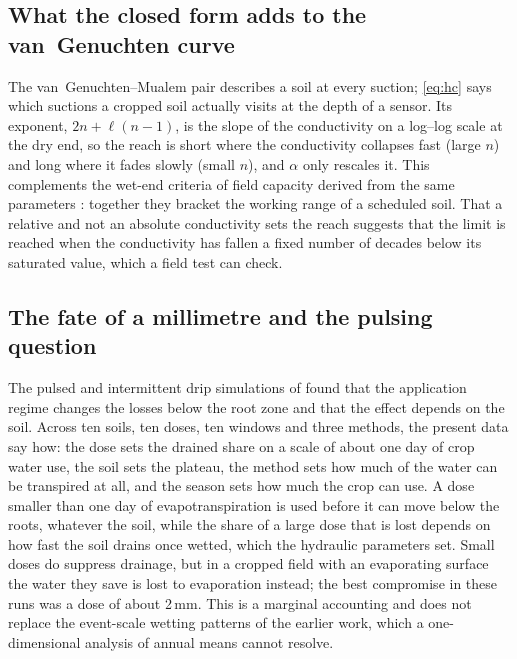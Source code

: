 \documentclass[review,12pt,authoryear]{elsarticle}
\begin{document}
\subsection{What the closed form adds to the van~Genuchten curve}
The van~Genuchten--Mualem pair describes a soil at every suction; \cref{eq:hc} says which suctions a cropped soil actually visits at the depth of a sensor. Its exponent, $2n+\ell(n-1)$, is the slope of the conductivity on a log--log scale at the dry end, so the reach is short where the conductivity collapses fast (large $n$) and long where it fades slowly (small $n$), and $\alpha$ only rescales it. This complements the wet-end criteria of field capacity derived from the same parameters \citep{Twarakavi2009,Assouline2014}: together they bracket the working range of a scheduled soil. That a relative and not an absolute conductivity sets the reach suggests that the limit is reached when the conductivity has fallen a fixed number of decades below its saturated value, which a field test can check.

\subsection{The fate of a millimetre and the pulsing question}
The pulsed and intermittent drip simulations of \citet{Elmaloglou2007,Elmaloglou2008,Elmaloglou2009b} found that the application regime changes the losses below the root zone and that the effect depends on the soil. Across ten soils, ten doses, ten windows and three methods, the present data say how: the dose sets the drained share on a scale of about one day of crop water use, the soil sets the plateau, the method sets how much of the water can be transpired at all, and the season sets how much the crop can use. A dose smaller than one day of evapotranspiration is used before it can move below the roots, whatever the soil, while the share of a large dose that is lost depends on how fast the soil drains once wetted, which the hydraulic parameters set. Small doses do suppress drainage, but in a cropped field with an evaporating surface the water they save is lost to evaporation instead; the best compromise in these runs was a dose of about 2\,mm. This is a marginal accounting and does not replace the event-scale wetting patterns of the earlier work, which a one-dimensional analysis of annual means cannot resolve.
\end{document}

